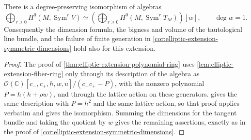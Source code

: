 \begin{proposition}\label{prop:elliptic-zero-ruling-section-ring}
There is a degree-preserving isomorphism of algebras
\[
 \bigoplus_{r\geq0}H^0(M,\operatorname{Sym}^rV)
 \simeq
 \left(\bigoplus_{r\geq0}H^0(M,\operatorname{Sym}^rT_M)\right)[w],
 \qquad \deg w=1.
\]
Consequently the dimension formula, the bigness and volume of the tautological line bundle, and the failure of finite generation in \cref{cor:elliptic-extension-symmetric-dimensions} hold also for this extension.
\end{proposition}
\begin{proof}
The proof of \cref{thm:elliptic-extension-polynomial-ring} uses \cref{lem:elliptic-extension-fiber-ring} only through its description of the algebra as $\mathcal O(\mathbb C)[c_-,c_+,h,w,u]/(c_-c_+-P)$, with the nonzero polynomial $P=h(h+\rho w)$, and through the lattice action on these generators.  gives the same description with $P=h^2$ and the same lattice action, so that proof applies verbatim and gives the isomorphism. Summing the dimensions for the tangent bundle and taking the quotient by $w$ gives the remaining assertions, exactly as in the proof of \cref{cor:elliptic-extension-symmetric-dimensions}.
\end{proof}

